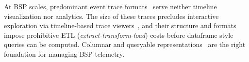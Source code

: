 At BSP scales, predominant event trace
formats~\cite{Eschw2012:OTF2,:ChromeJsonTEF,:CaliperPerformanceAnalysis} serve neither timeline
visualization nor analytics.
The size of these traces precludes interactive exploration via timeline-based trace
viewers~\cite{:PerfettoSystemProfiling},
and their structure and formats impose prohibitive ETL (\emph{extract-transform-load}) costs before
dataframe
style queries can be computed.
Columnar and queryable representations~\cite{:Parquet} are the right foundation for managing BSP
telemetry.